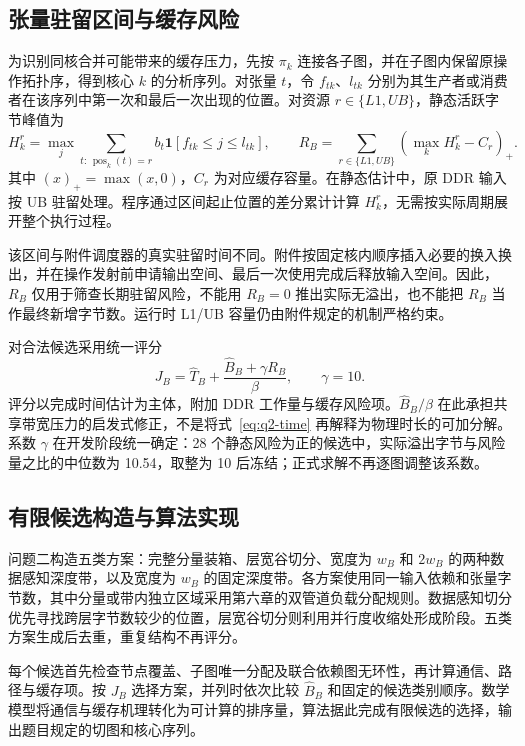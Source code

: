 \subsection{张量驻留区间与缓存风险}
为识别同核合并可能带来的缓存压力，先按 $\pi_k$ 连接各子图，并在子图内保留原操作拓扑序，得到核心 $k$ 的分析序列。对张量 $t$，令 $f_{tk}$、$l_{tk}$ 分别为其生产者或消费者在该序列中第一次和最后一次出现的位置。对资源 $r\in\{L1,UB\}$，静态活跃字节峰值为
\begin{equation}
H_k^r=\max_j\sum_{t:\,\operatorname{pos}_k(t)=r}
b_t\mathbf1[f_{tk}\le j\le l_{tk}],\qquad
R_B=\sum_{r\in\{L1,UB\}}\left(\max_k H_k^r-C_r\right)_+.
\label{eq:q2-memory}
\end{equation}
其中 $(x)_+=\max(x,0)$，$C_r$ 为对应缓存容量。在静态估计中，原 DDR 输入按 UB 驻留处理。程序通过区间起止位置的差分累计计算 $H_k^r$，无需按实际周期展开整个执行过程。

该区间与附件调度器的真实驻留时间不同。附件按固定核内顺序插入必要的换入换出，并在操作发射前申请输出空间、最后一次使用完成后释放输入空间。因此，$R_B$ 仅用于筛查长期驻留风险，不能用 $R_B=0$ 推出实际无溢出，也不能把 $R_B$ 当作最终新增字节数。运行时 L1/UB 容量仍由附件规定的机制严格约束。

对合法候选采用统一评分
\begin{equation}
J_B=\widehat T_B+\frac{\widehat B_B+\gamma R_B}{\beta},\qquad \gamma=10.
\label{eq:q2-score}
\end{equation}
评分以完成时间估计为主体，附加 DDR 工作量与缓存风险项。$\widehat B_B/\beta$ 在此承担共享带宽压力的启发式修正，不是将式~\eqref{eq:q2-time} 再解释为物理时长的可加分解。系数 $\gamma$ 在开发阶段统一确定：28 个静态风险为正的候选中，实际溢出字节与风险量之比的中位数为 10.54，取整为 10 后冻结；正式求解不再逐图调整该系数。

\subsection{有限候选构造与算法实现}
问题二构造五类方案：完整分量装箱、层宽谷切分、宽度为 $w_B$ 和 $2w_B$ 的两种数据感知深度带，以及宽度为 $w_B$ 的固定深度带。各方案使用同一输入依赖和张量字节数，其中分量或带内独立区域采用第六章的双管道负载分配规则。数据感知切分优先寻找跨层字节数较少的位置，层宽谷切分则利用并行度收缩处形成阶段。五类方案生成后去重，重复结构不再评分。

每个候选首先检查节点覆盖、子图唯一分配及联合依赖图无环性，再计算通信、路径与缓存项。按 $J_B$ 选择方案，并列时依次比较 $\widehat B_B$ 和固定的候选类别顺序。数学模型将通信与缓存机理转化为可计算的排序量，算法据此完成有限候选的选择，输出题目规定的切图和核心序列。

